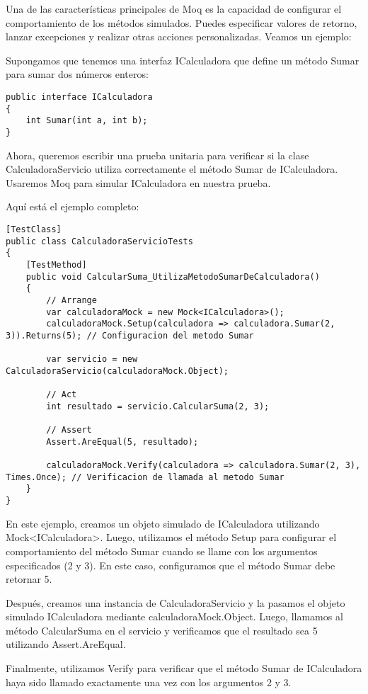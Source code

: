 \documentclass[executivepaper]{article}
\begin{document}
Una de las características principales de Moq es la capacidad de configurar el comportamiento de los métodos simulados. Puedes especificar valores de retorno, lanzar excepciones y realizar otras acciones personalizadas. Veamos un ejemplo:

Supongamos que tenemos una interfaz ICalculadora que define un método Sumar para sumar dos números enteros:

\begin{lstlisting}
public interface ICalculadora
{
    int Sumar(int a, int b);
}
\end{lstlisting}
Ahora, queremos escribir una prueba unitaria para verificar si la clase CalculadoraServicio utiliza correctamente el método Sumar de ICalculadora. Usaremos Moq para simular ICalculadora en nuestra prueba.

Aquí está el ejemplo completo:
\begin{lstlisting}
[TestClass]
public class CalculadoraServicioTests
{
    [TestMethod]
    public void CalcularSuma_UtilizaMetodoSumarDeCalculadora()
    {
        // Arrange
        var calculadoraMock = new Mock<ICalculadora>();
        calculadoraMock.Setup(calculadora => calculadora.Sumar(2, 3)).Returns(5); // Configuracion del metodo Sumar

        var servicio = new CalculadoraServicio(calculadoraMock.Object);

        // Act
        int resultado = servicio.CalcularSuma(2, 3);

        // Assert
        Assert.AreEqual(5, resultado);

        calculadoraMock.Verify(calculadora => calculadora.Sumar(2, 3), Times.Once); // Verificacion de llamada al metodo Sumar
    }
}
\end{lstlisting}
En este ejemplo, creamos un objeto simulado de ICalculadora utilizando Mock<ICalculadora>. Luego, utilizamos el método Setup para configurar el comportamiento del método Sumar cuando se llame con los argumentos especificados (2 y 3). En este caso, configuramos que el método Sumar debe retornar 5.

Después, creamos una instancia de CalculadoraServicio y la pasamos el objeto simulado ICalculadora mediante calculadoraMock.Object. Luego, llamamos al método CalcularSuma en el servicio y verificamos que el resultado sea 5 utilizando Assert.AreEqual.

Finalmente, utilizamos Verify para verificar que el método Sumar de ICalculadora haya sido llamado exactamente una vez con los argumentos 2 y 3.
\end{document}
